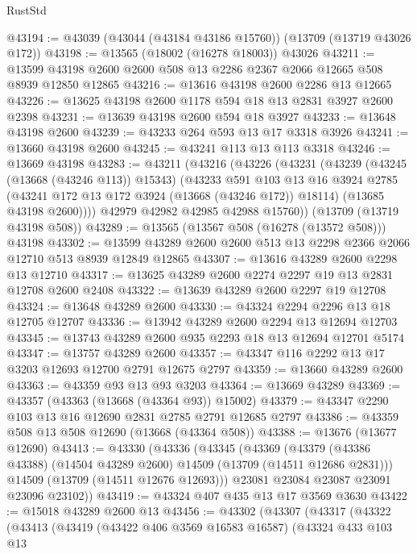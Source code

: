 \begin{lexlean}{RustStd}
\begin{coremodule}
@43194 := @43039 (@43044 (@43184 @43186 @15760)) (@13709 (@13719 @43026 @172))
@43198 := @13565 (@18002 (@16278 @18003)) @43026
@43211 := @13599 @43198 @2600 @2600 @508 @13 @2286 @2367 @2066 @12665 @508 @8939 @12850 @12865
@43216 := @13616 @43198 @2600 @2286 @13 @12665
@43226 := @13625 @43198 @2600 @1178 @594 @18 @13 @2831 @3927 @2600 @2398
@43231 := @13639 @43198 @2600 @594 @18 @3927
@43233 := @13648 @43198 @2600
@43239 := @43233 @264 @593 @13 @17 @3318 @3926
@43241 := @13660 @43198 @2600
@43245 := @43241 @113 @13 @113 @3318
@43246 := @13669 @43198
@43283 := @43211
    (@43216
      (@43226
        (@43231
          (@43239
            (@43245 (@13668 (@43246 @113)) @15343)
            (@43233
              @591
              @103
              @13
              @16
              @3924
              @2785
              (@43241 @172 @13 @172 @3924 (@13668 (@43246 @172)) @18114)
              (@13685 @43198 @2600))))
        @42979
        @42982
        @42985
        @42988
        @15760))
    (@13709 (@13719 @43198 @508))
@43289 := @13565 (@13567 @508 (@16278 (@13572 @508))) @43198
@43302 := @13599 @43289 @2600 @2600 @513 @13 @2298 @2366 @2066 @12710 @513 @8939 @12849 @12865
@43307 := @13616 @43289 @2600 @2298 @13 @12710
@43317 := @13625 @43289 @2600 @2274 @2297 @19 @13 @2831 @12708 @2600 @2408
@43322 := @13639 @43289 @2600 @2297 @19 @12708
@43324 := @13648 @43289 @2600
@43330 := @43324 @2294 @2296 @13 @18 @12705 @12707
@43336 := @13942 @43289 @2600 @2294 @13 @12694 @12703
@43345 := @13743 @43289 @2600 @935 @2293 @18 @13 @12694 @12701 @5174
@43347 := @13757 @43289 @2600
@43357 := @43347 @116 @2292 @13 @17 @3203 @12693 @12700 @2791 @12675 @2797
@43359 := @13660 @43289 @2600
@43363 := @43359 @93 @13 @93 @3203
@43364 := @13669 @43289
@43369 := @43357 (@43363 (@13668 (@43364 @93)) @15002)
@43379 := @43347 @2290 @103 @13 @16 @12690 @2831 @2785 @2791 @12685 @2797
@43386 := @43359 @508 @13 @508 @12690 (@13668 (@43364 @508))
@43388 := @13676 (@13677 @12690)
@43413 := @43330
    (@43336
      (@43345
        (@43369
          (@43379 (@43386 @43388) (@14504 @43289 @2600) @14509 (@13709 (@14511 @12686 @2831)))
          @14509
          (@13709 (@14511 @12676 @12693)))
        @23081
        @23084
        @23087
        @23091
        @23096
        @23102))
@43419 := @43324 @407 @435 @13 @17 @3569 @3630
@43422 := @15018 @43289 @2600 @13
@43456 := @43302
    (@43307
      (@43317
        (@43322
          (@43413
            (@43419
              (@43422 @406 @3569 @16583 @16587)
              (@43324
                @433
                @103
                @13

\end{coremodule}
\end{lexlean}
